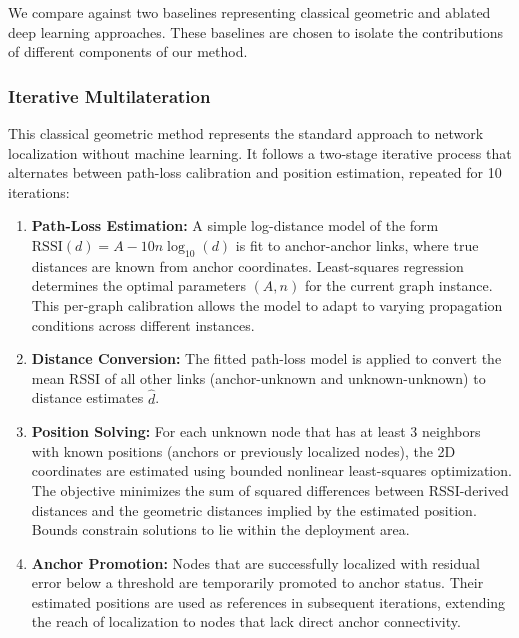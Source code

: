 \documentclass[master,final,11pt]{iscs-thesis}
\begin{document}
We compare against two baselines representing classical geometric and ablated deep learning approaches.
These baselines are chosen to isolate the contributions of different components of our method.

\subsubsection{Iterative Multilateration}

This classical geometric method represents the standard approach to network localization without machine learning.
It follows a two-stage iterative process that alternates between path-loss calibration and position estimation, repeated for 10 iterations:

\begin{enumerate}
    \item \textbf{Path-Loss Estimation:} A simple log-distance model of the form $\text{RSSI}(d) = A - 10n\log_{10}(d)$ is fit to anchor-anchor links, where true distances are known from anchor coordinates.
    Least-squares regression determines the optimal parameters $(A, n)$ for the current graph instance.
    This per-graph calibration allows the model to adapt to varying propagation conditions across different instances.
    
    \item \textbf{Distance Conversion:} The fitted path-loss model is applied to convert the mean RSSI of all other links (anchor-unknown and unknown-unknown) to distance estimates $\hat{d}$.
    
    \item \textbf{Position Solving:} For each unknown node that has at least 3 neighbors with known positions (anchors or previously localized nodes), the 2D coordinates are estimated using bounded nonlinear least-squares optimization.
    The objective minimizes the sum of squared differences between RSSI-derived distances and the geometric distances implied by the estimated position.
    Bounds constrain solutions to lie within the deployment area.
    
    \item \textbf{Anchor Promotion:} Nodes that are successfully localized with residual error below a threshold are temporarily promoted to anchor status.
    Their estimated positions are used as references in subsequent iterations, extending the reach of localization to nodes that lack direct anchor connectivity.
\end{enumerate}
\end{document}
